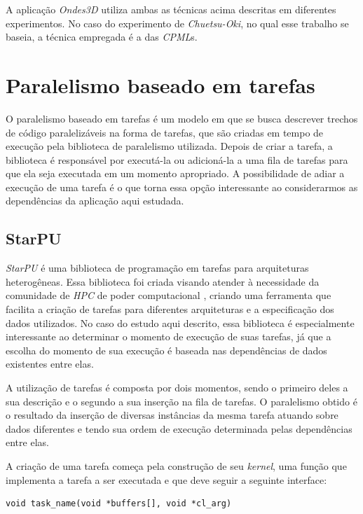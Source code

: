\documentclass[cic,tc]{iiufrgs}
\begin{document}
A aplicação \textit{Ondes3D} utiliza ambas as técnicas acima descritas em diferentes experimentos. No caso do experimento de \textit{Chuetsu-Oki}, no qual esse trabalho se baseia, a técnica
empregada é a das \textit{CPML}s.


\section{Paralelismo baseado em tarefas}

O paralelismo baseado em tarefas é um modelo em que se busca descrever trechos de código paralelizáveis na forma de tarefas, que são criadas em tempo de execução pela biblioteca de
paralelismo utilizada. Depois de criar a tarefa, a biblioteca é responsável por executá-la ou adicioná-la a uma fila de tarefas para que ela seja executada em um momento apropriado.
A possibilidade de adiar a execução de uma tarefa é o que torna essa opção interessante ao considerarmos as dependências da aplicação aqui estudada.

\subsection{StarPU}

\textit{StarPU} é uma biblioteca de programação em tarefas para arquiteturas heterogêneas. Essa biblioteca foi criada visando atender à necessidade da comunidade de \textit{HPC} de
poder computacional \cite{StarPU}, criando uma ferramenta que facilita a criação de tarefas para diferentes arquiteturas e a especificação dos dados utilizados. No caso do estudo aqui
descrito, essa biblioteca é especialmente interessante ao determinar o momento de execução de suas tarefas, já que a escolha do momento de sua execução é baseada nas dependências de dados
existentes entre elas.

A utilização de tarefas é composta por dois momentos, sendo o primeiro deles a sua descrição e o segundo a sua inserção na fila de tarefas. O paralelismo obtido é o resultado da inserção de
diversas instâncias da mesma tarefa atuando sobre dados diferentes e tendo sua ordem de execução determinada pelas dependências entre elas.

A criação de uma tarefa começa pela construção de seu \textit{kernel}, uma função que implementa a tarefa a ser executada e que deve seguir a seguinte interface:

\begin{verbatim}
void task_name(void *buffers[], void *cl_arg)
\end{verbatim}
\end{document}
